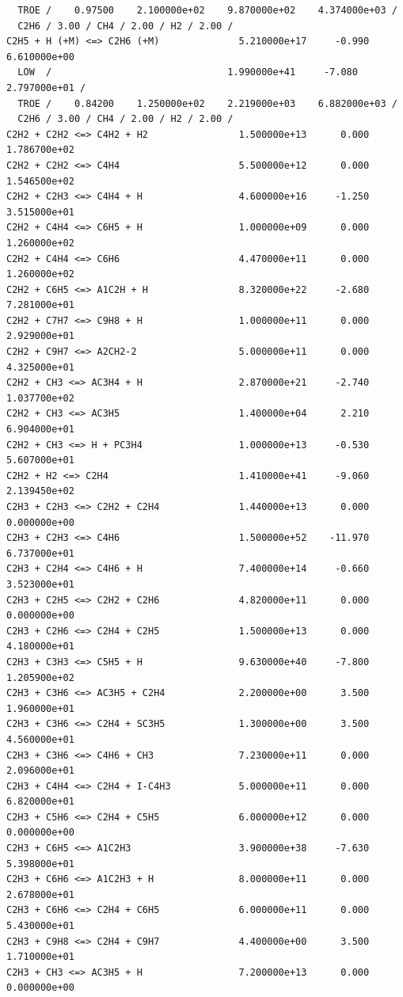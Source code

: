 \begin{verbatim}
  TROE /    0.97500    2.100000e+02    9.870000e+02    4.374000e+03 /
  C2H6 / 3.00 / CH4 / 2.00 / H2 / 2.00 / 
C2H5 + H (+M) <=> C2H6 (+M)              5.210000e+17     -0.990    6.610000e+00
  LOW  /                               1.990000e+41     -7.080    2.797000e+01 /
  TROE /    0.84200    1.250000e+02    2.219000e+03    6.882000e+03 /
  C2H6 / 3.00 / CH4 / 2.00 / H2 / 2.00 / 
C2H2 + C2H2 <=> C4H2 + H2                1.500000e+13      0.000    1.786700e+02
C2H2 + C2H2 <=> C4H4                     5.500000e+12      0.000    1.546500e+02
C2H2 + C2H3 <=> C4H4 + H                 4.600000e+16     -1.250    3.515000e+01
C2H2 + C4H4 <=> C6H5 + H                 1.000000e+09      0.000    1.260000e+02
C2H2 + C4H4 <=> C6H6                     4.470000e+11      0.000    1.260000e+02
C2H2 + C6H5 <=> A1C2H + H                8.320000e+22     -2.680    7.281000e+01
C2H2 + C7H7 <=> C9H8 + H                 1.000000e+11      0.000    2.929000e+01
C2H2 + C9H7 <=> A2CH2-2                  5.000000e+11      0.000    4.325000e+01
C2H2 + CH3 <=> AC3H4 + H                 2.870000e+21     -2.740    1.037700e+02
C2H2 + CH3 <=> AC3H5                     1.400000e+04      2.210    6.904000e+01
C2H2 + CH3 <=> H + PC3H4                 1.000000e+13     -0.530    5.607000e+01
C2H2 + H2 <=> C2H4                       1.410000e+41     -9.060    2.139450e+02
C2H3 + C2H3 <=> C2H2 + C2H4              1.440000e+13      0.000    0.000000e+00
C2H3 + C2H3 <=> C4H6                     1.500000e+52    -11.970    6.737000e+01
C2H3 + C2H4 <=> C4H6 + H                 7.400000e+14     -0.660    3.523000e+01
C2H3 + C2H5 <=> C2H2 + C2H6              4.820000e+11      0.000    0.000000e+00
C2H3 + C2H6 <=> C2H4 + C2H5              1.500000e+13      0.000    4.180000e+01
C2H3 + C3H3 <=> C5H5 + H                 9.630000e+40     -7.800    1.205900e+02
C2H3 + C3H6 <=> AC3H5 + C2H4             2.200000e+00      3.500    1.960000e+01
C2H3 + C3H6 <=> C2H4 + SC3H5             1.300000e+00      3.500    4.560000e+01
C2H3 + C3H6 <=> C4H6 + CH3               7.230000e+11      0.000    2.096000e+01
C2H3 + C4H4 <=> C2H4 + I-C4H3            5.000000e+11      0.000    6.820000e+01
C2H3 + C5H6 <=> C2H4 + C5H5              6.000000e+12      0.000    0.000000e+00
C2H3 + C6H5 <=> A1C2H3                   3.900000e+38     -7.630    5.398000e+01
C2H3 + C6H6 <=> A1C2H3 + H               8.000000e+11      0.000    2.678000e+01
C2H3 + C6H6 <=> C2H4 + C6H5              6.000000e+11      0.000    5.430000e+01
C2H3 + C9H8 <=> C2H4 + C9H7              4.400000e+00      3.500    1.710000e+01
C2H3 + CH3 <=> AC3H5 + H                 7.200000e+13      0.000    0.000000e+00

\end{verbatim}
